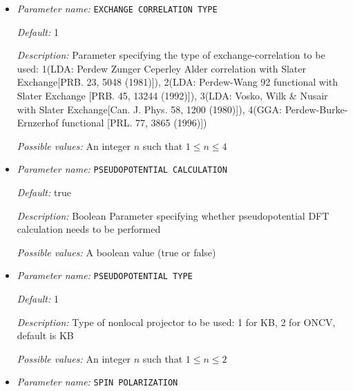 \begin{itemize}
\item {\it Parameter name:} {\tt EXCHANGE CORRELATION TYPE}
\label{parameters:DFT functional related parameters/EXCHANGE CORRELATION TYPE}
\label{parameters:DFT_20functional_20related_20parameters/EXCHANGE_20CORRELATION_20TYPE}


{\it Default:} 1


{\it Description:} Parameter specifying the type of exchange-correlation to be used: 1(LDA: Perdew Zunger Ceperley Alder correlation with Slater Exchange[PRB. 23, 5048 (1981)]), 2(LDA: Perdew-Wang 92 functional with Slater Exchange [PRB. 45, 13244 (1992)]), 3(LDA: Vosko, Wilk \& Nusair with Slater Exchange[Can. J. Phys. 58, 1200 (1980)]), 4(GGA: Perdew-Burke-Ernzerhof functional [PRL. 77, 3865 (1996)])


{\it Possible values:} An integer $n$ such that $1\leq n \leq 4$
\item {\it Parameter name:} {\tt PSEUDOPOTENTIAL CALCULATION}
\label{parameters:DFT functional related parameters/PSEUDOPOTENTIAL CALCULATION}
\label{parameters:DFT_20functional_20related_20parameters/PSEUDOPOTENTIAL_20CALCULATION}


{\it Default:} true


{\it Description:} Boolean Parameter specifying whether pseudopotential DFT calculation needs to be performed


{\it Possible values:} A boolean value (true or false)
\item {\it Parameter name:} {\tt PSEUDOPOTENTIAL TYPE}
\label{parameters:DFT functional related parameters/PSEUDOPOTENTIAL TYPE}
\label{parameters:DFT_20functional_20related_20parameters/PSEUDOPOTENTIAL_20TYPE}


{\it Default:} 1


{\it Description:} Type of nonlocal projector to be used: 1 for KB, 2 for ONCV, default is KB


{\it Possible values:} An integer $n$ such that $1\leq n \leq 2$
\item {\it Parameter name:} {\tt SPIN POLARIZATION}
\label{parameters:DFT functional related parameters/SPIN POLARIZATION}
\label{parameters:DFT_20functional_20related_20parameters/SPIN_20POLARIZATION}



\end{itemize}
